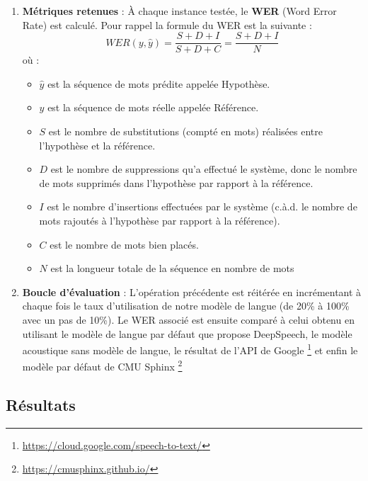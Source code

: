 \begin{enumerate}
		\item \textbf{Métriques retenues} : À chaque instance testée, le \textbf{WER} (Word Error Rate) est calculé. Pour rappel la formule du WER est la suivante :
		\begin{equation*}
			WER(y,\hat{y}) = \frac{S+D+I}{S+D+C} = \frac{S+D+I}{N}
		\end{equation*}
		où : 
		\begin{itemize}
			\item $\hat{y}$ est la séquence de mots prédite appelée Hypothèse.
			\item $y$ est la séquence de mots réelle appelée Référence.
			\item $S$ est le nombre de substitutions (compté en mots) réalisées entre l'hypothèse et la référence.
			\item $D$ est le nombre de suppressions qu'a effectué le système, donc le nombre de mots supprimés dans l'hypothèse par rapport à la référence.
			\item $I$ est le nombre d'insertions effectuées par le système (c.à.d. le nombre de mots rajoutés à l'hypothèse par rapport à la référence).
			\item $C$ est le nombre de mots bien placés.
			\item $N$ est la longueur totale de la séquence en nombre de mots
		\end{itemize}
		\item \textbf{Boucle d'évaluation} : L'opération précédente est réitérée en incrémentant à chaque fois le taux d'utilisation de notre modèle de langue (de 20\% à 100\% avec un pas de 10\%). Le WER associé est ensuite comparé à celui obtenu en utilisant le modèle de langue par défaut que propose DeepSpeech, le modèle acoustique sans modèle de langue, le résultat de l'API de Google \footnote{\url{https://cloud.google.com/speech-to-text/}} et enfin le modèle par défaut de CMU Sphinx \footnote{\url{https://cmusphinx.github.io/}}
		
	\end{enumerate}
	\subsection{Résultats}
